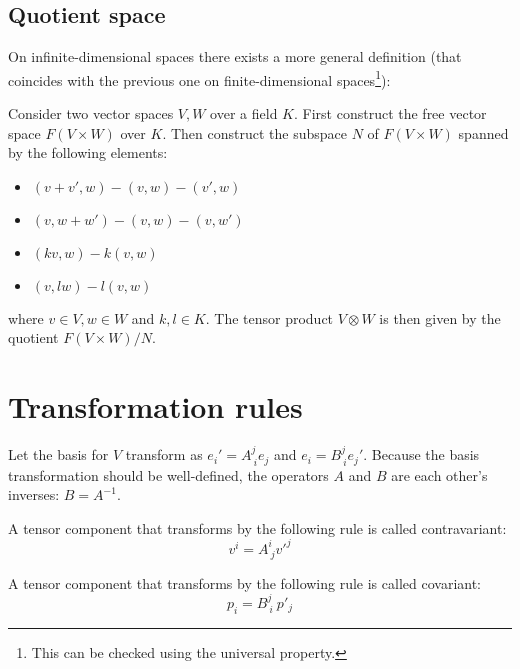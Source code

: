 \subsection{Quotient space}

	On infinite-dimensional spaces there exists a more general definition (that coincides with the previous one on finite-dimensional spaces\footnote{This can be checked using the universal property.}):
	\begin{construct}
		Consider two vector spaces $V, W$ over a field $K$. First construct the free vector space $F(V\times W)$ over $K$. Then construct the subspace $N$ of $F(V\times W)$ spanned by the following elements:
		\begin{itemize}
			\item $(v+v', w) - (v, w) - (v', w)$
			\item $(v, w+w') - (v, w) - (v, w')$
			\item $(kv, w) - k(v, w)$
			\item $(v, lw) - l(v, w)$
		\end{itemize}
		where $v\in V, w\in W$ and  $k,l\in K$. The tensor product $V\otimes W$ is then given by the quotient $F(V\times W)/N$.
	\end{construct}

\section{Transformation rules}

	Let the basis for $V$ transform as $e_i' = A^j_{\ i}e_j$ and $e_i = B^j_{\ i}e_j'$. Because the basis transformation should be well-defined, the operators $A$ and $B$ are each other's inverses: $B = A^{-1}$.

	\begin{definition}[Contravariant]
		A tensor component that transforms by the following rule is called contravariant:
	        \begin{equation}
			\label{tensorcalculus:contravariant}
		        v^i = A^i_{\ j}v'^j
		\end{equation}
	\end{definition}
    
	\begin{definition}[Covariant]
		A tensor component that transforms by the following rule is called covariant:
	        \begin{equation}
			\label{tensorcalculus:covariant}
		        p_i = B^j_{\ i}\ p'_j
		\end{equation}
	\end{definition}
    
